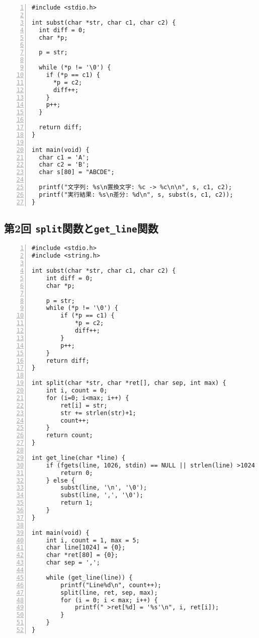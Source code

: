 \documentclass[autodetect-engine,dvi=dvipdfmx,ja=standard,
               a4j,11pt]{bxjsarticle}
\begin{document}
\begin{Verbatim}[numbers=left, xleftmargin=10mm, numbersep=6pt,
    fontsize=\small, baselinestretch=0.8]
#include <stdio.h>

int subst(char *str, char c1, char c2) {
  int diff = 0;
  char *p;

  p = str;

  while (*p != '\0') {
    if (*p == c1) {
      *p = c2;
      diff++;
    }
    p++;
  }

  return diff;
}

int main(void) {
  char c1 = 'A';
  char c2 = 'B';
  char s[80] = "ABCDE";

  printf("文字列: %s\n置換文字: %c -> %c\n\n", s, c1, c2);
  printf("実行結果: %s\n差分: %d\n", s, subst(s, c1, c2));
}

\end{Verbatim}

\subsection{第2回 \texttt{split}関数と\texttt{get\_line}関数} \label{code:2}

\begin{Verbatim}[numbers=left, xleftmargin=10mm, numbersep=6pt,
    fontsize=\small, baselinestretch=0.8]
#include <stdio.h>
#include <string.h>

int subst(char *str, char c1, char c2) {
    int diff = 0;
    char *p;

    p = str;
    while (*p != '\0') {
        if (*p == c1) {
            *p = c2;
            diff++;
        }
        p++;
    }
    return diff;
}

int split(char *str, char *ret[], char sep, int max) {
    int i, count = 0;
    for (i=0; i<max; i++) {
        ret[i] = str;
        str += strlen(str)+1;
        count++;
    }
    return count;
}

int get_line(char *line) {
    if (fgets(line, 1026, stdin) == NULL || strlen(line) >1024 || *line == '\n') {
        return 0;
    } else {
        subst(line, '\n', '\0');
        subst(line, ',', '\0');
        return 1;
    }
}

int main(void) {
    int i, count = 1, max = 5;
    char line[1024] = {0};
    char *ret[80] = {0};
    char sep = ',';

    while (get_line(line)) {
        printf("Line%d\n", count++);
        split(line, ret, sep, max);
        for (i = 0; i < max; i++) {
            printf(" >ret[%d] = '%s'\n", i, ret[i]);
        }
    }
}

\end{Verbatim}
\end{document}
